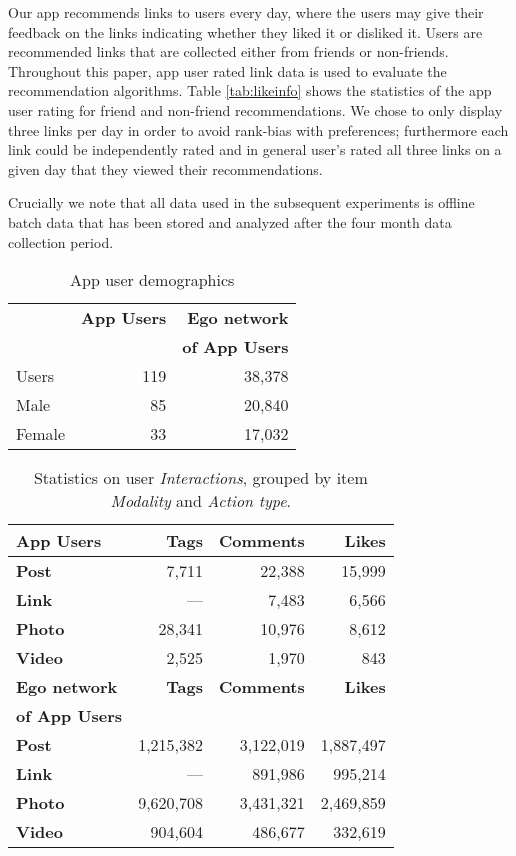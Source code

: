 Our app recommends links to users every day, where the users may give
their feedback on the links indicating whether they liked it or
disliked it. Users are recommended links that are collected either
from friends or non-friends. Throughout this paper, app user rated
link data is used to evaluate the recommendation algorithms.
Table \ref{tab:likeinfo} shows the statistics of the app user rating
for friend and non-friend recommendations.  We chose to only display
three links per day in order to avoid rank-bias with preferences;
furthermore each link could be independently rated and in general
user's rated all three links on a given day that they viewed their
recommendations.

Crucially we note that all data used in the subsequent experiments
is offline batch data that has been stored and analyzed after the four month
data collection period.  
      							
\begin{table}
\centering
\begin{tabular}{|>{\small}l|>{\small}r|>{\small}r|}
\hline
& \textbf{App Users} & \textbf{Ego network} \\
& & \textbf{of App Users} \\
\hline
Users & 119 & 38,378 \\
\hline
Male & 85 & 20,840 \\
\hline
Female & 33 & 17,032 \\
\hline
\end{tabular}
\caption{App user demographics}
\label{tab:demographics}
\end{table}

\begin{table}
\centering
\begin{tabular}{|>{\small}l|>{\small}r|>{\small}r|>{\small}r|}
\hline
\textbf{App Users} & \textbf{Tags} & \textbf{Comments} & \textbf{Likes} \\
\hline
\textbf{Post} & 7,711 & 22,388 & 15,999 \\
\hline
\textbf{Link}  & --- & 7,483 & 6,566 \\
\hline
\textbf{Photo} & 28,341 & 10,976 & 8,612 \\
\hline
\textbf{Video} & 2,525 & 1,970 & 843 \\
\hline
\hline
\textbf{Ego network} & \textbf{Tags} & \textbf{Comments} & \textbf{Likes} \\
\textbf{of App Users}  & & & \\
\hline
\textbf{Post} & 1,215,382 & 3,122,019 & 1,887,497 \\
\hline
\textbf{Link} & --- & 891,986 & 995,214 \\
\hline
\textbf{Photo} & 9,620,708 & 3,431,321 & 2,469,859 \\
\hline
\textbf{Video} & 904,604 & 486,677 & 332,619 \\
\hline
\end{tabular}
\caption{Statistics on user {\em Interactions}, grouped by item {\em Modality} and {\em Action type}.}
\label{tab:interactions}
\end{table}


